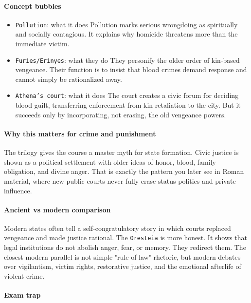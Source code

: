 \documentclass[11pt]{article}
\begin{document}
\paragraph{Concept bubbles}

\begin{itemize}
\item \texttt{Pollution}: what it does Pollution marks serious wrongdoing as spiritually and socially contagious. It explains why homicide threatens more than the immediate victim.
\item \texttt{Furies/Erinyes}: what they do They personify the older order of kin-based vengeance. Their function is to insist that blood crimes demand response and cannot simply be rationalized away.
\item \texttt{Athena's court}: what it does The court creates a civic forum for deciding blood guilt, transferring enforcement from kin retaliation to the city. But it succeeds only by incorporating, not erasing, the old vengeance powers.
\end{itemize}

\paragraph{Why this matters for crime and punishment}

The trilogy gives the course a master myth for state formation. Civic justice is shown as a political settlement with older ideas of honor, blood, family obligation, and divine anger. That is exactly the pattern you later see in Roman material, where new public courts never fully erase status politics and private influence.

\paragraph{Ancient vs modern comparison}

Modern states often tell a self-congratulatory story in which courts replaced vengeance and made justice rational. The \texttt{Oresteia} is more honest. It shows that legal institutions do not abolish anger, fear, or memory. They redirect them. The closest modern parallel is not simple "rule of law" rhetoric, but modern debates over vigilantism, victim rights, restorative justice, and the emotional afterlife of violent crime.

\paragraph{Exam trap}
\end{document}
